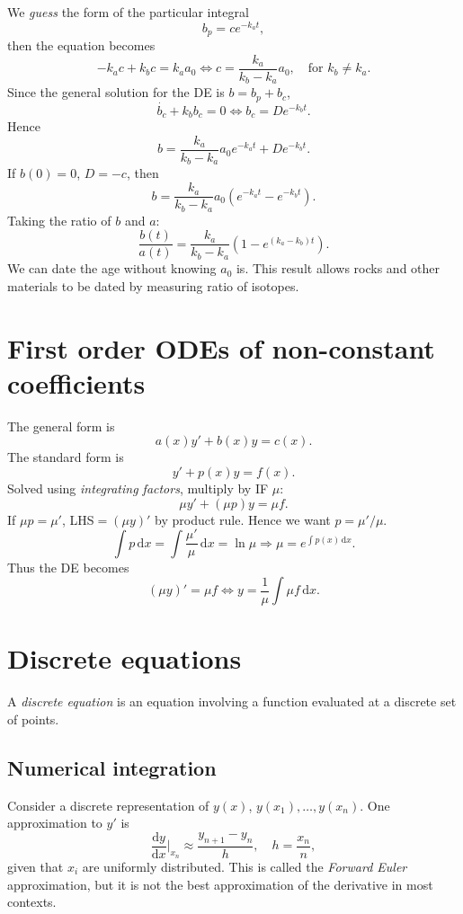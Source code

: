 \documentclass[10pt]{article}
\begin{document}
    We \textit{guess} the form of the particular integral
    \[
        b_p = ce^{-k_a t}
    ,\]
    then the equation becomes 
    \[
        -k_a c+k_b c = k_a a_0 \Longleftrightarrow c=\frac{k_a}{k_b-k_a}a_0,\quad \text{for }k_b\neq k_a
    .\]
    Since the general solution for the DE is $b=b_p+b_c$,
    \[
        \dot{b_c}+k_b b_c = 0 \Longleftrightarrow b_c = De^{-k_b t}
    .\]
    Hence
    \[
        b=\frac{k_{a}}{k_{b}-k_{a}} a_{0} e^{-k_{a} t}+D e^{-k_{b} t}
    .\]
    If $b(0)=0$, $ D = -c $, then 
    \[
        b = \frac{k_a}{k_b-k_a}a_0\left( e^{-k_a t}-e^{-k_b t} \right)
    .\]
    Taking the ratio of $ b $ and $a$:
    \[
        \frac{b(t)}{a(t)} = \frac{k_a}{k_b-k_a}\left( 1-e^{(k_a-k_b)t} \right)
    .\]
    We can date the age without knowing $a_0$ is. This result allows rocks and other materials to be dated by measuring ratio of isotopes.
    \section{First order ODEs of non-constant coefficients}
    The general form is 
    \[
        a(x)y'+b(x)y = c(x)
    .\]
    The standard form is 
    \[
        y'+ p(x)y=f(x)
    .\]
    Solved using \textit{integrating factors}, multiply by IF $\mu$:
    \[
        \mu y'+(\mu p)y=\mu f
    .\]
    If $ \mu p=\mu' $, LHS$= (\mu y)' $ by product rule. Hence we want $p = \mu'/\mu$.
    \[
        \int p \,\mathrm{d}x = \int \frac{\mu'}{\mu} \,\mathrm{d}x = \ln \mu \Longrightarrow\boxed{\mu = e^{\int p(x) \,\mathrm{d}x}}
    .\]
    Thus the DE becomes 
    \[
        (\mu y)' = \mu f \Longleftrightarrow y = \frac{1}{\mu}\int \mu f \,\mathrm{d}x
    .\]
    \section{Discrete equations}
    A \textit{discrete equation} is an equation involving a function evaluated at a discrete set of points.
    \subsection{Numerical integration}
    Consider a discrete representation of $y(x)$, $ y(x_1),\dots,y(x_{n}) $. One approximation to $y'$ is 
    \[
        \frac{\mathrm{d}y}{\mathrm{d}x}\Big|_{x_n} \approx \frac{y_{n+1}-y_n}{h},\quad h=\frac{x_n}{n} 
    ,\]
    given that $x_i$ are uniformly distributed. This is called the \textit{Forward Euler} approximation, but it is not the best approximation of the derivative in most contexts.
    
\end{document}
